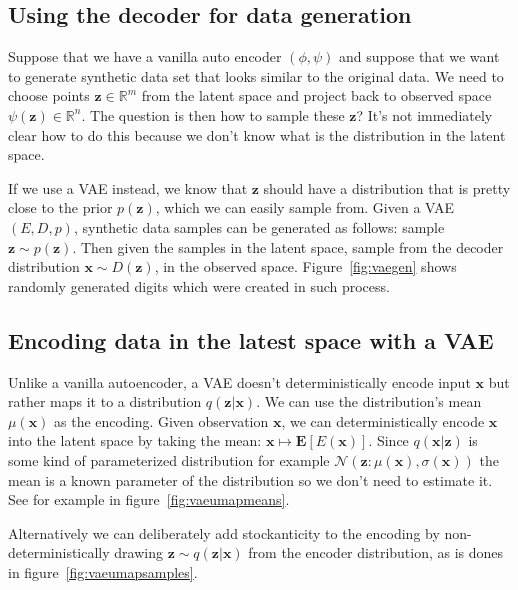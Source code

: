 \documentclass[11pt, a4paper]{report}
\theoremstyle{plain}
\theoremstyle{definition}
\theoremstyle{remark}
\newcommand{\R}{\mathbb{R}}
\newcommand{\E}{\mathbf{E}}
\newcommand{\x}{\mathbf{x}}
\newcommand{\z}{\mathbf{z}}
\newcommand{\NN}{\mathcal{N}}
\begin{document}
\subsection{Using the decoder for data generation}

Suppose that we have a vanilla auto encoder $(\phi, \psi)$ and suppose that we
want to generate synthetic data set that looks similar to the original data.
We need to choose points $\z \in \R^m$ from the latent space and project back to
observed space $\psi(\z) \in \R^n$. The question is then how to sample these $\z$?
It's not immediately clear how to do this because we don't know what is the
distribution in the latent space.

If we use a VAE instead, we know that $\z$ should have a distribution that is pretty
close to the prior $p(\z)$, which we can easily sample from.
Given a VAE $(E, D, p)$, synthetic data samples can be generated as follows:
sample $\z \sim p(\z)$. Then given the samples in the latent space, sample
from the decoder distribution $\x \sim D(\z)$, in the observed space.
Figure~\ref{fig:vaegen} shows randomly generated digits which were created in such 
process.

\subsection{Encoding data in the latest space with a VAE}

Unlike a vanilla autoencoder, a VAE doesn't deterministically encode input $\x$
but rather maps it to a distribution $q(\z | \x)$.
We can use the distribution's mean $\mu(\x)$ as the
encoding. 
Given observation $\x$, we can deterministically encode $\x$ into 
the latent space by taking the mean: $\x \mapsto \E [E(\x)]$. 
Since $q(\x | \z)$ is some kind of parameterized distribution for example 
$\NN(\z: \mu(\x), \sigma(\x))$  
the mean is a known parameter of the distribution so we don't need to estimate
it. See for example in figure~\ref{fig:vaeumapmeans}.

Alternatively we can deliberately add stockanticity to the encoding by 
non-deterministically drawing $\z \sim q(\z | \x)$ from the encoder
distribution,
as is dones in figure~\ref{fig:vaeumapsamples}.
\end{document}
